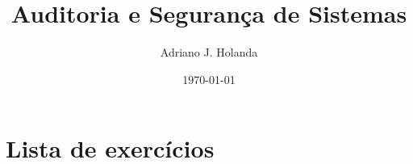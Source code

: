 \documentclass{article}
\title{Auditoria e Segurança de Sistemas}
\author{Adriano J. Holanda}
\date{\today}
\newcounter{exno}
\let\IN
\renewcommand\setcounter{exno}{0}}
\begin{document}
\maketitle

\section*{Lista de exercícios}

%
%
%
%
%


\end{document}
